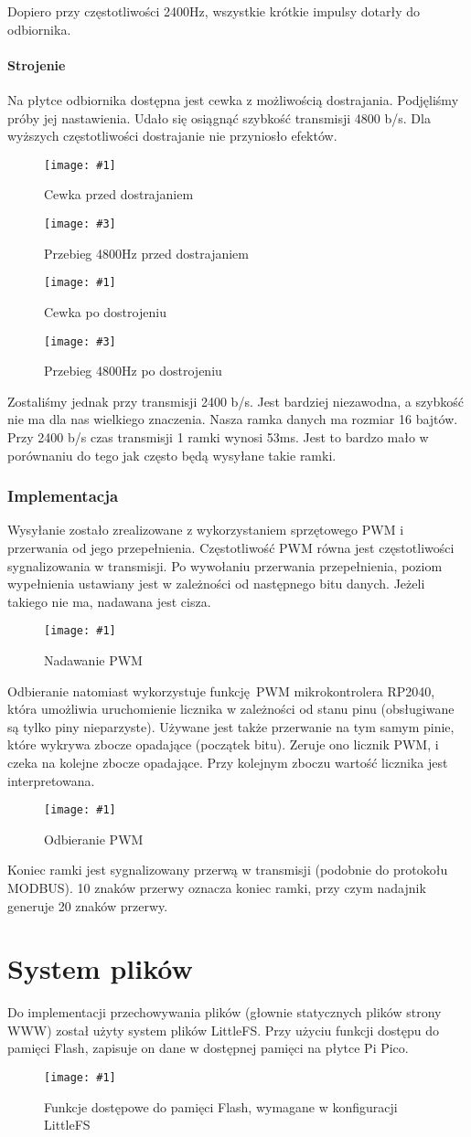 \documentclass[12pt]{article}
\newcommand{\imgcustomsize}[3]{
	\begin{figure}[H]
		\centering
		\texttt{[image: \#1]}
		\caption{#2}
	\end{figure}
}
\newcommand{\img}[2]{\imgcustomsize{#1}{#2}{0.8}}
\newcommand{\imgsidebyside}[4]{
	\begin{figure}[H]
		\centering
		\begin{minipage}{.45\textwidth}
			\centering
			\texttt{[image: \#1]}
			\caption{#2}
		\end{minipage}%
		\hfill
		\begin{minipage}{.45\textwidth}
			\centering
			\texttt{[image: \#3]}
			\caption{#4}
		\end{minipage}
	\end{figure}
}
\begin{document}
			Dopiero przy częstotliwości 2400Hz, wszystkie krótkie impulsy dotarły do odbiornika.

			\paragraph{Strojenie}
			Na płytce odbiornika dostępna jest cewka z możliwością dostrajania. Podjęliśmy próby jej nastawienia. Udało się osiągnąć szybkość transmisji 4800 b/s. Dla wyższych częstotliwości dostrajanie nie przyniosło efektów.
			\imgsidebyside{bauds/tuning/ph_before}{Cewka przed dostrajaniem}{bauds/tuning/4800_before}{Przebieg 4800Hz przed dostrajaniem}
			\imgsidebyside{bauds/tuning/ph_after}{Cewka po dostrojeniu}{bauds/tuning/4800_after}{Przebieg 4800Hz po dostrojeniu}

			Zostaliśmy jednak przy transmisji 2400 b/s. Jest bardziej niezawodna, a szybkość nie ma dla nas wielkiego znaczenia. Nasza ramka danych ma rozmiar 16 bajtów. Przy 2400 b/s czas transmisji 1 ramki wynosi 53ms. Jest to bardzo mało w porównaniu do tego jak często będą wysyłane takie ramki.

			\subsubsection{Implementacja}
				Wysyłanie zostało zrealizowane z wykorzystaniem sprzętowego PWM i przerwania od jego przepełnienia. Częstotliwość PWM równa jest częstotliwości sygnalizowania w transmisji. Po wywołaniu przerwania przepełnienia, poziom wypełnienia ustawiany jest w zależności od następnego bitu danych. Jeżeli takiego nie ma, nadawana jest cisza.
				\imgcustomsize{pgm/pwm_tx}{Nadawanie PWM}{0.6}

				Odbieranie natomiast wykorzystuje funkcję PWM mikrokontrolera RP2040, która umożliwia uruchomienie licznika w zależności od stanu pinu (obsługiwane są tylko piny nieparzyste). Używane jest także przerwanie na tym samym pinie, które wykrywa zbocze opadające (początek bitu). Zeruje ono licznik PWM, i czeka na kolejne zbocze opadające. Przy kolejnym zboczu wartość licznika jest interpretowana.
				\imgcustomsize{pgm/pwm_rx}{Odbieranie PWM}{0.6}
	 			Koniec ramki jest sygnalizowany przerwą w transmisji (podobnie do protokołu MODBUS). 10 znaków przerwy oznacza koniec ramki, przy czym nadajnik generuje 20 znaków przerwy.

	 \section{System plików}
	 	Do implementacji przechowywania plików (głownie statycznych plików strony WWW) został użyty system plików LittleFS. Przy użyciu funkcji dostępu do pamięci Flash, zapisuje on dane w dostępnej pamięci na płytce Pi Pico.
	 	\img{pgm/littlefs}{Funkcje dostępowe do pamięci Flash, wymagane w konfiguracji LittleFS}
\end{document}
